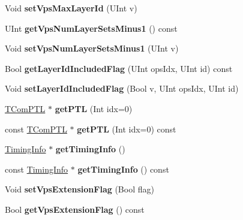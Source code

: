 \begin{DoxyCompactItemize}
Void {\bfseries set\+Vps\+Max\+Layer\+Id} (U\+Int v)
\item 
\mbox{\label{class_t_com_v_p_s_a409a4812cb052304fb262f73e2020818}} 
U\+Int {\bfseries get\+Vps\+Num\+Layer\+Sets\+Minus1} () const
\item 
\mbox{\label{class_t_com_v_p_s_a5c6413570229f9c6a88b014f301ae50a}} 
Void {\bfseries set\+Vps\+Num\+Layer\+Sets\+Minus1} (U\+Int v)
\item 
\mbox{\label{class_t_com_v_p_s_a28cc8b9eaab2ef9c5c30436172e4c498}} 
Bool {\bfseries get\+Layer\+Id\+Included\+Flag} (U\+Int ops\+Idx, U\+Int id) const
\item 
\mbox{\label{class_t_com_v_p_s_a125db77caa9656c7b43adf632f5f30b9}} 
Void {\bfseries set\+Layer\+Id\+Included\+Flag} (Bool v, U\+Int ops\+Idx, U\+Int id)
\item 
\mbox{\label{class_t_com_v_p_s_a4e216f24a87ce56bf4e21e549b296d55}} 
\hyperlink{class_t_com_p_t_l}{T\+Com\+P\+TL} $\ast$ {\bfseries get\+P\+TL} (Int idx=0)
\item 
\mbox{\label{class_t_com_v_p_s_a041a1b6dd90e9a8e84eef4a22c3060e4}} 
const \hyperlink{class_t_com_p_t_l}{T\+Com\+P\+TL} $\ast$ {\bfseries get\+P\+TL} (Int idx=0) const
\item 
\mbox{\label{class_t_com_v_p_s_abd9a7d511d01738a40691b92749b3952}} 
\hyperlink{class_timing_info}{Timing\+Info} $\ast$ {\bfseries get\+Timing\+Info} ()
\item 
\mbox{\label{class_t_com_v_p_s_a73fed8c14724b69109aa563192ed52ad}} 
const \hyperlink{class_timing_info}{Timing\+Info} $\ast$ {\bfseries get\+Timing\+Info} () const
\item 
\mbox{\label{class_t_com_v_p_s_a1db3ec88ba00ab3b2131a4d073869bd5}} 
Void {\bfseries set\+Vps\+Extension\+Flag} (Bool flag)
\item 
\mbox{\label{class_t_com_v_p_s_a5599e3b0426d8bfab5eaaff1d3879275}} 
Bool {\bfseries get\+Vps\+Extension\+Flag} () const

\end{DoxyCompactItemize}
